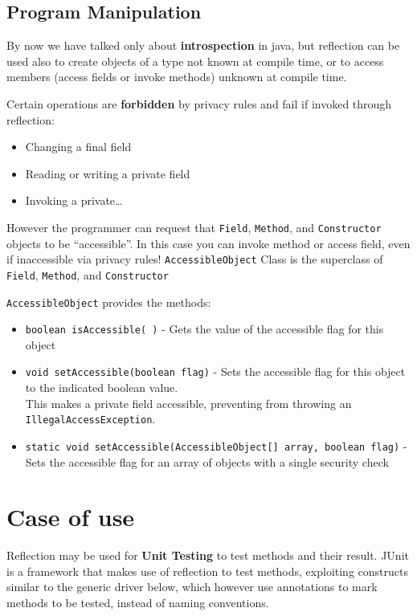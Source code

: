 \subsection{Program Manipulation}
By now we have talked only about \textbf{introspection} in java,
but reflection can be used also to create objects of a type not known at compile time,
or to access members (access fields or invoke methods) unknown at compile time.

{Certain operations are \textbf{forbidden} by privacy rules and fail if invoked through reflection:\ns
\begin{itemize}
	\item Changing a final field
	\item Reading or writing a private field
	\item Invoking a private\dots
\end{itemize}}

However the programmer can request that \texttt{Field}, \texttt{Method}, and
\texttt{Constructor} objects to be ``accessible''.
In this case you can invoke method or access field, even if
inaccessible via privacy rules!
\lstinline|AccessibleObject| Class is the superclass of \lstinline|Field|,
\lstinline|Method|, and \lstinline|Constructor|

{\lstinline|AccessibleObject| provides the methods:\ns
\begin{itemize}
	\item \lstinline|boolean isAccessible( )| - Gets the value of the accessible flag for this object
	\item \lstinline|void setAccessible(boolean flag)| - Sets the accessible flag for this object to the indicated boolean value.\\
	This makes a private field accessible, preventing from throwing an \lstinline|IllegalAccessException|.
	\item \lstinline|static void setAccessible(AccessibleObject[] array, boolean flag)| - Sets the accessible flag for an array of objects with a single security check
\end{itemize}}

\section{Case of use}
Reflection may be used for \textbf{Unit Testing} to test methods and their result. JUnit is a framework that makes use of reflection to test methods, exploiting constructs similar to the generic driver below, which however use annotations to mark methods to be tested, instead of naming conventions.

